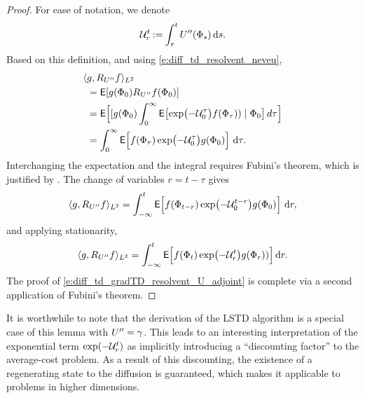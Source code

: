 \begin{proof}
	For ease of notation, we denote
	\begin{equation}
	{\cal U}_r^t \mathbin{:=} \int_{r}^{t} U''(\Phi_s) \,\textmd{d} s.
	\end{equation}
	Based on this definition,  and using \eqref{e:diff_td_resolvent_neveu},  
	\begin{equation*}
	\begin{aligned}
	\langle &g, R_{U''}   f \rangle_{L^2}
	\\
	& ={\sf E}[g(\Phi_0)R_{U''}f(\Phi_0)]
	\\
	& = {\sf E}\Bigl[  [g(\Phi_0)\int_{0}^{\infty} {\sf E}\bigl[\exp\bigl(- {\cal U}_0^\tau  \bigr)f(\Phi_\tau)) \mid \Phi_0\bigr]\,d\tau \Bigr]
	\\
	& =\int_0^\infty {\sf E}\Bigl[ f(\Phi_\tau)  \exp\bigl(- {\cal U}_0^\tau  \bigr) g(\Phi_0) \Bigr]\, \,\textmd{d}\tau.
	\end{aligned}
	\end{equation*}
	Interchanging the expectation and the integral requires Fubini's theorem, which is justified by . The change of variables $r = t - \tau$ gives
	\begin{equation}
	\langle g, R_{U''} f \rangle_{L^2} =
	\int_{-\infty}^t  {\sf E}\Bigl[ f(\Phi_{t-r})  \exp \bigl(- {\cal U}_0^{t-r} \bigr) g(\Phi_0)\Bigr]\, \,\textmd{d} r,
	\end{equation}
	and applying stationarity,
	\begin{equation}
	\langle g, R_{U''} f \rangle_{L^2} =
	\int_{-\infty}^t {\sf E}\Bigl[ f(\Phi_t) \exp\bigl(- {\cal U}_r^t \bigr) g(\Phi_r))\Bigr] \,\textmd{d} r.
	\end{equation}
	The proof of \eqref{e:diff_td_gradTD_resolvent_U_adjoint}
	is complete via a second application of Fubini's theorem.
\end{proof}

It is worthwhile to note that the derivation of the LSTD algorithm is a special case of this lemma with $U'' = \gamma$. This leads to an interesting interpretation of the exponential term $\exp(-{\cal U}_r^t)$ as implicitly introducing a ``discounting factor'' to the average-cost problem. As a result of this discounting, the existence of a regenerating state to the diffusion is guaranteed, which makes it applicable to problems in higher dimensions.  

